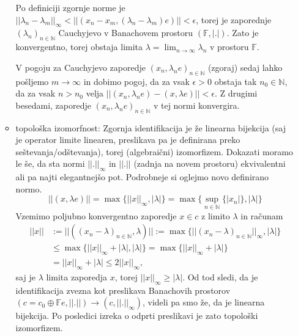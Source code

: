 \documentclass[a4paper, 12pt]{article}
\newcommand{\N}{\mathbb{N}}
\newcommand{\F}{\mathbb{F}}
\begin{document}
\begin{enumerate}[label=(\alph*)]
\begin{itemize}
		Po definiciji zgornje norme je $||\lambda_n - \lambda_m||_\infty < ||(x_n - x_m, (\lambda_n-\lambda_m)e)|| < \epsilon$,
		torej je zaporednje $(\lambda_n)_{n\in\N}$ Cauchyjevo v Banachovem prostoru $(\F, |.|)$. Zato je konvergentno, torej obstaja limita $\lambda = \lim_{n \to \infty} \lambda_n$ v prostoru $\F$.
		
		V pogoju za Cauchyjevo zaporedje $(x_n, \lambda_n e)_{n\in\N}$ (zgoraj) sedaj lahko pošljemo $m \to \infty$ in dobimo pogoj, da za vsak $\epsilon > 0$ obstaja tak $n_0 \in \N$, da za vsak $n > n_0$ velja $||(x_n, \lambda_n e) - (x, \lambda e) || < \epsilon$. Z drugimi besedami, zaporedje $(x_n, \lambda_n e)_{n\in\N}$ v tej normi konvergira.
		\item topološka izomorfnost:
		Zgornja identifikacija je že linearna bijekcija (saj je operator limite linearen, preslikava pa je definirana preko seštevanja/odštevanja), torej (algebraični) izomorfizem. Dokazati moramo le še, da sta normi $||.||_\infty$ in $||.||$ (zadnja na novem prostoru) ekvivalentni ali pa najti elegantnejšo pot.
		Podrobneje si oglejmo novo definirano normo.
		\[
		||(x, \lambda e)|| = \max\lbrace ||x||_\infty, |\lambda| \rbrace = \max\lbrace \sup_{n\in\N}\lbrace |x_n| \rbrace, |\lambda| \rbrace
		\]
		Vzemimo poljubno konvergentno zaporedje $x \in c$ z limito $\lambda$ in računam
		\begin{align*}
		||x|| &:= ||((x_n-\lambda)_{n\in\N}, \lambda)|| := \max\lbrace ||(x_n - \lambda)_{n\in\N}||_\infty, |\lambda|\rbrace \\ 
		&\leq \max\lbrace ||x||_\infty + |\lambda|, |\lambda|\rbrace = \max\lbrace ||x||_\infty + |\lambda|\rbrace \\
		& = ||x||_\infty + |\lambda| \leq 2 ||x||_\infty,
		\end{align*}
		saj je $\lambda$ limita zaporedja $x$, torej $||x||_\infty \geq |\lambda|$.
		Od tod sledi, da je identifikacija zvezna kot preslikava Banachovih prostorov $(c = c_0 \oplus \F e, ||.||) \to (c, ||.||_\infty)$, videli pa smo že, da je linearna bijekcija. Po posledici izreka o odprti preslikavi je zato topološki izomorfizem.
	\end{itemize}
\end{enumerate}
\end{document}
